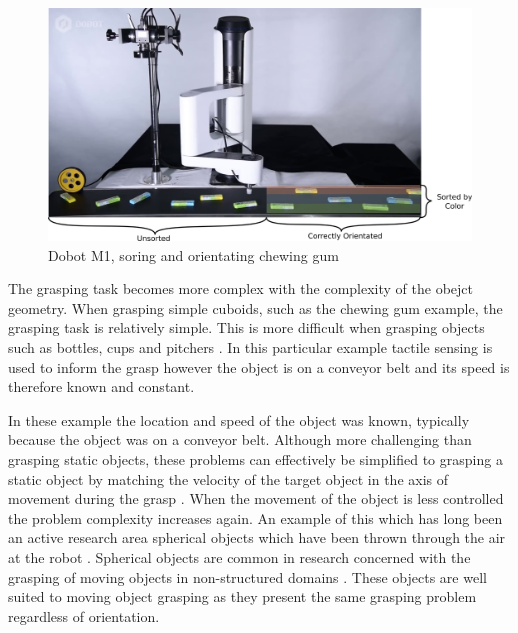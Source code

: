 \begin{figure}
    \centering
    \includegraphics[width=.4\textwidth]{Images/Sorting.png}
    \caption{Dobot M1, soring and orientating chewing gum}
    \label{fig:SortingChewingGum}
\end{figure}

The grasping task becomes more complex with the complexity of the obejct geometry. When grasping simple cuboids, such as the chewing gum example, the grasping task is relatively simple. This is more difficult when grasping objects such as bottles, cups and pitchers \cite{ConveyorUnknownObject}. In this particular example tactile sensing is used to inform the grasp however the object is on a conveyor belt and its speed is therefore known and constant.

In these example the location and speed of the object was known, typically because the object was on a conveyor belt. Although more challenging than grasping static objects, these problems can effectively be simplified to grasping a static object by matching the velocity of the target object in the axis of movement during the grasp \cite{FingertipEmitterReceiverMovingObjectII,FingertipEmitterReceiverMovingObject}. When the movement of the object is less controlled the problem complexity increases again. An example of this which has long been an active research area spherical objects which have been thrown through the air at the robot \cite{1991BallTracking}. Spherical objects are common in research concerned with the grasping of moving objects in non-structured domains \cite{DisneyRobot,RollinJustin,EarlyAnticipation}. These objects are well suited to moving object grasping as they present the same grasping problem regardless of orientation. 

